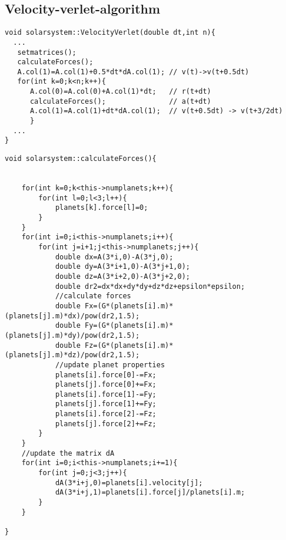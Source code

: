 \documentclass[10pt,a4paper]{article}
\begin{document}
\subsection{Velocity-verlet-algorithm}
\begin{lstlisting}
void solarsystem::VelocityVerlet(double dt,int n){
  ...
   setmatrices();
   calculateForces();                              
   A.col(1)=A.col(1)+0.5*dt*dA.col(1); // v(t)->v(t+0.5dt)
   for(int k=0;k<n;k++){
      A.col(0)=A.col(0)+A.col(1)*dt;   // r(t+dt)
      calculateForces();               // a(t+dt)
      A.col(1)=A.col(1)+dt*dA.col(1);  // v(t+0.5dt) -> v(t+3/2dt)
      }
  ...
}
\end{lstlisting}

\begin{lstlisting}
void solarsystem::calculateForces(){

    
    for(int k=0;k<this->numplanets;k++){
        for(int l=0;l<3;l++){
            planets[k].force[l]=0;
        }
    }
    for(int i=0;i<this->numplanets;i++){
        for(int j=i+1;j<this->numplanets;j++){
            double dx=A(3*i,0)-A(3*j,0);
            double dy=A(3*i+1,0)-A(3*j+1,0);
            double dz=A(3*i+2,0)-A(3*j+2,0);
            double dr2=dx*dx+dy*dy+dz*dz+epsilon*epsilon;
            //calculate forces
            double Fx=(G*(planets[i].m)*(planets[j].m)*dx)/pow(dr2,1.5);
            double Fy=(G*(planets[i].m)*(planets[j].m)*dy)/pow(dr2,1.5);
            double Fz=(G*(planets[i].m)*(planets[j].m)*dz)/pow(dr2,1.5);
            //update planet properties
            planets[i].force[0]-=Fx;
            planets[j].force[0]+=Fx;
            planets[i].force[1]-=Fy;
            planets[j].force[1]+=Fy;
            planets[i].force[2]-=Fz;
            planets[j].force[2]+=Fz;
        }
    }
    //update the matrix dA
    for(int i=0;i<this->numplanets;i+=1){
        for(int j=0;j<3;j++){
            dA(3*i+j,0)=planets[i].velocity[j];
            dA(3*i+j,1)=planets[i].force[j]/planets[i].m;
        }
    }
    
}
\end{lstlisting}
\end{document}
